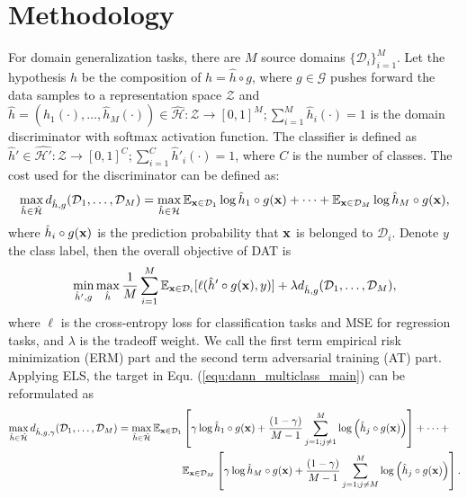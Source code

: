 \documentclass{article} \usepackage{iclr2023_conference,times}
\newcommand{\E}{\mathbb{E}}
\newcommand{\ls}[0]{ELS\xspace}
\newcommand{\myref}[1]{Equ. (\ref{#1})}
\newcommand{\D}{\mathcal{D}}
\begin{document}
\vspace{-0.1cm}
\section{Methodology}
\vspace{-0.1cm}


For domain generalization tasks, there are $M$ source domains $\{\D_i\}_{i=1}^M$. Let the hypothesis $h$ be the composition of $h=\hat{h}\circ g$, where $g\in\mathcal{G}$ pushes forward the data samples to a representation space $\mathcal{Z}$ and $\hat{h}=(\hat{h}_1(\cdot),\dots,\hat{h}_M(\cdot))\in\hat{\mathcal{H}}:\mathcal{Z}\rightarrow[0,1]^M;\sum_{i=1}^M\hat{h}_i(\cdot)=1$ is the domain discriminator with softmax activation function. The classifier is defined as $\hat{h}'\in\hat{\mathcal{H}'}:\mathcal{Z}\rightarrow[0,1]^C;\sum_{i=1}^C\hat{h}'_i(\cdot)=1$, where $C$ is the number of classes. The cost used for the discriminator can be defined as:
\begin{equation}
    \max_{\hat{h}\in\hat{\mathcal{H}}} d_{\hat{h}, g}(\D_1,\dots,\D_M)=\max_{\hat{h}\in{\mathcal{H}}} \E_{\x\in \D_1}\log \hat{h}_1\circ g(\x)+\dots+\E_{\x\in\D_M} \log\hat{h}_M\circ g(\x),
    \label{equ:dann_multiclass_main}
\end{equation}
where $\hat{h}_i\circ g(\mathbf{x})$ is the prediction probability that $\mathbf{x}$ is belonged to $\D_i$. Denote $y$ the class label, then the overall objective of DAT is
\begin{equation}
\min_{\hat{h}',g}\max_{\hat{h}}\frac{1}{M}\sum_{i=1}^M\mathbb{E}_{\x\in\D_i}[\ell(\hat{h}'\circ g(\x), y)]+\lambda d_{\hat{h},g}(\D_1,\dots,\D_M),
\end{equation}
where $\ell$ is the cross-entropy loss for classification tasks and MSE for regression tasks, and $\lambda$ is the tradeoff weight. We call the first term empirical risk minimization (ERM) part and the second term adversarial training (AT) part.
Applying \ls, the target in \myref{equ:dann_multiclass_main} can be reformulated as
\begin{equation}
\begin{aligned}
\max_{\hat{h}\in\hat{\mathcal{H}}} d_{\hat{h},g,\gamma}(\D_1,\dots,\D_M)=\max_{\hat{h}\in\hat{\mathcal{H}}} \E_{\x\in \D_1}&\left[\gamma\log \hat{h}_1\circ g(\x)+\frac{(1-\gamma)}{M-1}\sum_{j=1;j\neq1}^M\log\left(\hat{h}_j\circ g(\x)\right) \right] + \dots +\\
&\E_{\x\in \D_M}\left[\gamma\log \hat{h}_M\circ g(\x)+\frac{(1-\gamma)}{M-1}\sum_{j=1;j\neq M}^M\log\left(\hat{h}_j\circ g(\x)\right) \right].
\end{aligned}\label{equ:dann_ls_main}
\end{equation}
\end{document}

